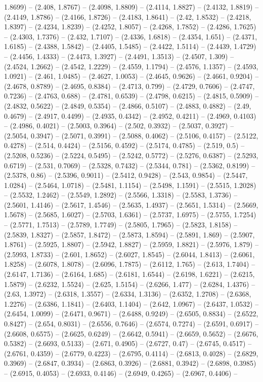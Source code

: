 1.8699) -- (2.408, 1.8767) -- (2.4098, 1.8809) -- (2.4114, 1.8827) -- (2.4132, 1.8819) -- (2.4149, 1.8786) -- (2.4166, 1.8726) -- (2.4183, 1.8641) -- (2.42, 1.8532) -- (2.4218, 1.8397) -- (2.4234, 1.8239) -- (2.4252, 1.8057) -- (2.4268, 1.7852) -- (2.4286, 1.7625) -- (2.4303, 1.7376) -- (2.432, 1.7107) -- (2.4336, 1.6818) -- (2.4354, 1.651) -- (2.4371, 1.6185) -- (2.4388, 1.5842) -- (2.4405, 1.5485) -- (2.4422, 1.5114) -- (2.4439, 1.4729) -- (2.4456, 1.4333) -- (2.4473, 1.3927) -- (2.4491, 1.3513) -- (2.4507, 1.309) -- (2.4524, 1.2662) -- (2.4542, 1.2229) -- (2.4559, 1.1794) -- (2.4576, 1.1357) -- (2.4593, 1.0921) -- (2.461, 1.0485) -- (2.4627, 1.0053) -- (2.4645, 0.9626) -- (2.4661, 0.9204) -- (2.4678, 0.8789) -- (2.4695, 0.8384) -- (2.4713, 0.799) -- (2.4729, 0.7606) -- (2.4747, 0.7236) -- (2.4763, 0.688) -- (2.4781, 0.6539) -- (2.4798, 0.6215) -- (2.4815, 0.5909) -- (2.4832, 0.5622) -- (2.4849, 0.5354) -- (2.4866, 0.5107) -- (2.4883, 0.4882) -- (2.49, 0.4679) -- (2.4917, 0.4499) -- (2.4935, 0.4342) -- (2.4952, 0.4211) -- (2.4969, 0.4103) -- (2.4986, 0.4021) -- (2.5003, 0.3964) -- (2.502, 0.3932) -- (2.5037, 0.3927) -- (2.5054, 0.3947) -- (2.5071, 0.3991) -- (2.5088, 0.4062) -- (2.5106, 0.4157) -- (2.5122, 0.4278) -- (2.514, 0.4424) -- (2.5156, 0.4592) -- (2.5174, 0.4785) -- (2.519, 0.5) -- (2.5208, 0.5236) -- (2.5224, 0.5495) -- (2.5242, 0.5772) -- (2.5276, 0.6387) -- (2.5293, 0.6719) -- (2.531, 0.7069) -- (2.5328, 0.7432) -- (2.5344, 0.781) -- (2.5362, 0.8199) -- (2.5378, 0.86) -- (2.5396, 0.9011) -- (2.5412, 0.9428) -- (2.543, 0.9854) -- (2.5447, 1.0284) -- (2.5464, 1.0718) -- (2.5481, 1.1154) -- (2.5498, 1.1591) -- (2.5515, 1.2028) -- (2.5532, 1.2462) -- (2.5549, 1.2892) -- (2.5566, 1.3318) -- (2.5583, 1.3736) -- (2.5601, 1.4146) -- (2.5617, 1.4546) -- (2.5635, 1.4937) -- (2.5651, 1.5314) -- (2.5669, 1.5678) -- (2.5685, 1.6027) -- (2.5703, 1.6361) -- (2.5737, 1.6975) -- (2.5755, 1.7254) -- (2.5771, 1.7513) -- (2.5789, 1.7749) -- (2.5805, 1.7965) -- (2.5823, 1.8158) -- (2.5839, 1.8327) -- (2.5857, 1.8472) -- (2.5873, 1.8594) -- (2.5891, 1.869) -- (2.5907, 1.8761) -- (2.5925, 1.8807) -- (2.5942, 1.8827) -- (2.5959, 1.8821) -- (2.5976, 1.879) -- (2.5993, 1.8733) -- (2.601, 1.8652) -- (2.6027, 1.8545) -- (2.6044, 1.8413) -- (2.6061, 1.8258) -- (2.6078, 1.8078) -- (2.6096, 1.7875) -- (2.6112, 1.765) -- (2.613, 1.7404) -- (2.6147, 1.7136) -- (2.6164, 1.685) -- (2.6181, 1.6544) -- (2.6198, 1.6221) -- (2.6215, 1.5879) -- (2.6232, 1.5524) -- (2.625, 1.5154) -- (2.6266, 1.477) -- (2.6284, 1.4376) -- (2.63, 1.3972) -- (2.6318, 1.3557) -- (2.6334, 1.3136) -- (2.6352, 1.2708) -- (2.6368, 1.2276) -- (2.6386, 1.1841) -- (2.6403, 1.1404) -- (2.642, 1.0967) -- (2.6437, 1.0532) -- (2.6454, 1.0099) -- (2.6471, 0.9671) -- (2.6488, 0.9249) -- (2.6505, 0.8834) -- (2.6522, 0.8427) -- (2.654, 0.8031) -- (2.6556, 0.7646) -- (2.6574, 0.7274) -- (2.6591, 0.6917) -- (2.6608, 0.6575) -- (2.6625, 0.6249) -- (2.6642, 0.5941) -- (2.6659, 0.5652) -- (2.6676, 0.5382) -- (2.6693, 0.5133) -- (2.671, 0.4905) -- (2.6727, 0.47) -- (2.6745, 0.4517) -- (2.6761, 0.4359) -- (2.6779, 0.4223) -- (2.6795, 0.4114) -- (2.6813, 0.4028) -- (2.6829, 0.3969) -- (2.6847, 0.3934) -- (2.6863, 0.3926) -- (2.6881, 0.3942) -- (2.6898, 0.3985) -- (2.6915, 0.4053) -- (2.6933, 0.4146) -- (2.6949, 0.4265) -- (2.6967, 0.4406) -- 